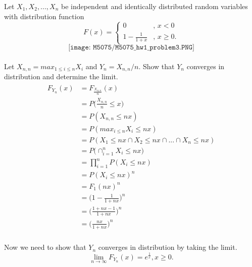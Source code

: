\documentclass[11pt]{article}
\theoremstyle{definition}
\newcommand{\1}[1]{\mathbf{1} \left \{ #1 \right \}}
\begin{document}
\item Let $X_1, X_2, ..., X_n$ be independent and identically distributed random variables with distribution function
\[F(x) =
\begin{cases}
0&\text{, $x < 0$} \\ 1 - \frac{1}{1+x}&\text{, $x \geq 0$.}
\end{cases}
\]
\[\texttt{[image: M5075/M5075\_hw1\_problem3.PNG]}\]
\\ Let \(X_{n,n} = max_{1 \leq i \leq n} X_i\) and \(Y_n = X_{n,n}/n\).  Show that $Y_n$ converges in distribution and determine the limit.
\\
\begin{align*}
    \begin{split}
        F_{Y_n} (x) & = F_{\frac{X_{n,n}}{n}} (x) \\
        & = P\bigg(\frac{X_{n,n}}{n} \leq x\bigg) \\
        & = P(X_{n,n} \leq nx) \\
        & = P(max_{i \leq n} X_i \leq nx) \\
        & = P(X_1 \leq nx \cap X_2 \leq nx \cap ... \cap X_n \leq nx) \\
        & = P\Big(\cap_{i=1}^n X_i \leq nx\Big) \\
        & = \prod_{i=1}^{n} P(X_i \leq nx) \\
        & = P(X_i \leq nx)^n \\
        & = F_1 (nx)^n \\
        & = \bigg(1 - \frac{1}{1 + nx}\bigg)^n \\
        & = \bigg(\frac{1 + nx - 1}{1 + nx} \bigg)^n \\
        & = \bigg(\frac{nx}{1 + nx}\bigg)^n
   \end{split}
\end{align*}
\\
Now we need to show that $Y_n$ converges in distribution by taking the limit. \\
\[ \lim_{n\to\infty} F_{Y_n} (x) = e^{\frac{1}{x}} , x \geq 0.\]
\end{document}
